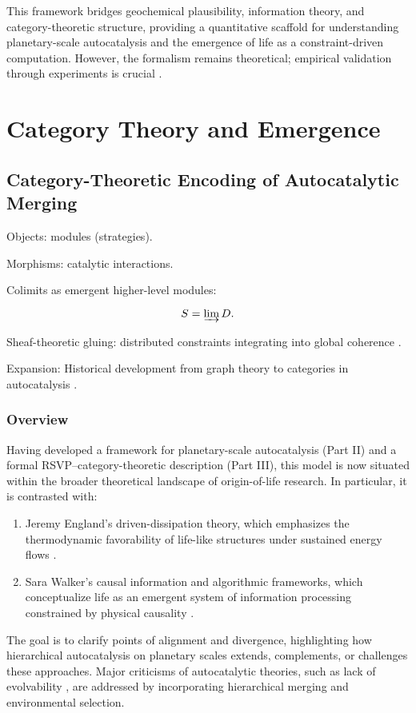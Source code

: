 \documentclass[openany]{book}
\begin{document}
This framework bridges geochemical plausibility, information theory, and category-theoretic structure, providing a quantitative scaffold for understanding planetary-scale autocatalysis and the emergence of life as a constraint-driven computation. However, the formalism remains theoretical; empirical validation through experiments is crucial \citep{sokolskyi2024, plum2025}.

\part{Category Theory and Emergence}

\chapter{Category-Theoretic Encoding of Autocatalytic Merging}
Objects: modules (strategies).

Morphisms: catalytic interactions.

Colimits as emergent higher-level modules:

\[S = \varinjlim D.\]

Sheaf-theoretic gluing: distributed constraints integrating into global coherence \citep{steel2013}.

Expansion: Historical development from graph theory to categories in autocatalysis \citep{hordijk2010}.

\section{Overview}
Having developed a framework for planetary-scale autocatalysis (Part II) and a formal RSVP–category-theoretic description (Part III), this model is now situated within the broader theoretical landscape of origin-of-life research. In particular, it is contrasted with:

\begin{enumerate}
\item Jeremy England’s driven-dissipation theory, which emphasizes the thermodynamic favorability of life-like structures under sustained energy flows \citep{england2013,england2015}.
\item Sara Walker’s causal information and algorithmic frameworks, which conceptualize life as an emergent system of information processing constrained by physical causality \citep{walker2013,walker2017}.
\end{enumerate}

The goal is to clarify points of alignment and divergence, highlighting how hierarchical autocatalysis on planetary scales extends, complements, or challenges these approaches. Major criticisms of autocatalytic theories, such as lack of evolvability \citep{vasas2010}, are addressed by incorporating hierarchical merging and environmental selection.
\end{document}

